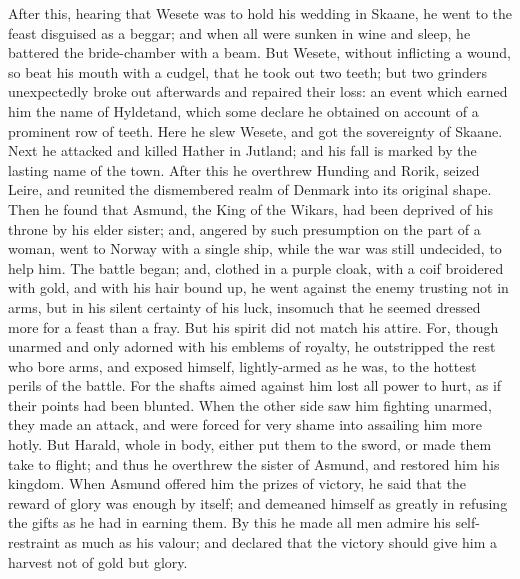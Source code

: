 \documentclass[10pt,a4paper]{report}
\begin{document}
After this, hearing that Wesete was to hold his wedding in Skaane, he went to the feast disguised as a beggar; and when all were sunken in wine and sleep, he battered the bride-chamber with a beam. But Wesete, without inflicting a wound, so beat his mouth with a cudgel, that he took out two teeth; but two grinders unexpectedly broke out afterwards and repaired their loss: an event which earned him the name of Hyldetand, which some declare he obtained on account of a prominent row of teeth. Here he slew Wesete, and got the sovereignty of Skaane. Next he attacked and killed Hather in Jutland; and his fall is marked by the lasting name of the town. After this he overthrew Hunding and Rorik, seized Leire, and reunited the dismembered realm of Denmark into its original shape. Then he found that Asmund, the King of the Wikars, had been deprived of his throne by his elder sister; and, angered by such presumption on the part of a woman, went to Norway with a single ship, while the war was still undecided, to help him. The battle began; and, clothed in a purple cloak, with a coif broidered with gold, and with his hair bound up, he went against the enemy trusting not in arms, but in his silent certainty of his luck, insomuch that he seemed dressed more for a feast than a fray. But his spirit did not match his attire. For, though unarmed and only adorned with his emblems of royalty, he outstripped the rest who bore arms, and exposed himself, lightly-armed as he was, to the hottest perils of the battle. For the shafts aimed against him lost all power to hurt, as if their points had been blunted. When the other side saw him fighting unarmed, they made an attack, and were forced for very shame into assailing him more hotly. But Harald, whole in body, either put them to the sword, or made them take to flight; and thus he overthrew the sister of Asmund, and restored him his kingdom. When Asmund offered him the prizes of victory, he said that the reward of glory was enough by itself; and demeaned himself as greatly in refusing the gifts as he had in earning them. By this he made all men admire his self-restraint as much as his valour; and declared that the victory should give him a harvest not of gold but glory.\\
\end{document}
